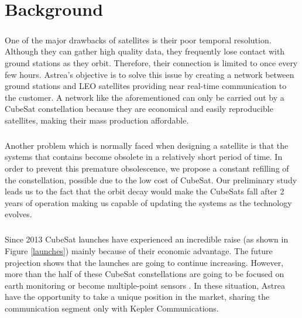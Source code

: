 \chapter{Background}
\paragraph{}
One of the major drawbacks of satellites is their poor temporal resolution. Although they can gather high quality data, they frequently lose contact with ground stations as they orbit. Therefore, their connection is limited to once every few hours. Astrea’s objective is to solve this issue by creating a network between ground stations and LEO satellites providing near real-time communication to the customer. A network like the aforementioned can only be carried out by a CubeSat constellation because they are economical and easily reproducible satellites, making their mass production affordable.

\paragraph{}
Another problem which is normally faced when designing a satellite is that the systems that contains become obsolete in a relatively short period of time. In order to prevent this premature obsolescence, we propose a constant refilling of the constellation, possible due to the low cost of CubeSat. Our preliminary study leads us to the fact that the orbit decay would make the CubeSats fall after 2 years of operation making us capable of updating the systems as the technology evolves.

\paragraph{}
Since 2013 CubeSat launches have experienced an incredible raise (as shown in Figure \ref{launches}) mainly because of their economic advantage. The future projection shows that the launches are going to continue increasing. However, more than the half of these CubeSat constellations are going to be focused on earth monitoring or become multiple-point sensors \cite{SpaceWorks}. In these situation, Astrea have the opportunity to take a unique position in the market, sharing the communication segment only with Kepler Communications\cite{keppler}.

